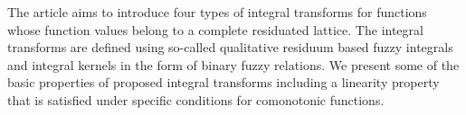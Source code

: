 
The article aims to introduce four types of integral transforms for functions whose function values belong to a complete residuated lattice. The integral transforms are defined using so-called qualitative residuum based fuzzy integrals and integral kernels in the form of binary fuzzy relations. We present some of the basic properties of proposed integral transforms including a linearity property that is satisfied under specific conditions for comonotonic functions. 


